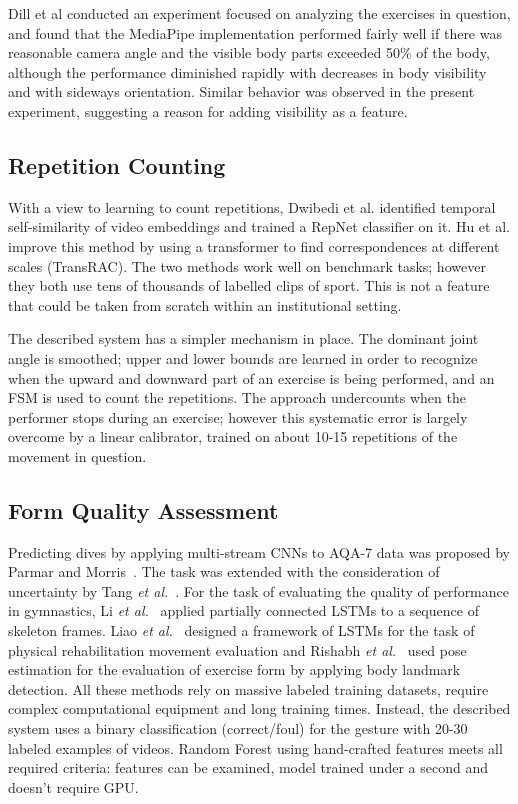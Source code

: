 \documentclass[conference]{IEEEtran}
\begin{document}
Dill et al \cite{dill2023} conducted an experiment focused on analyzing the exercises in question, and found that the MediaPipe implementation performed fairly well if there was reasonable camera angle and the visible body parts exceeded 50\% of the body, although the performance diminished rapidly with decreases in body visibility and with sideways orientation. Similar behavior was observed in the present experiment, suggesting a reason for adding visibility as a feature.

\subsection{Repetition Counting}
With a view to learning to count repetitions, Dwibedi et al. \cite{dwibedi2020} identified temporal self-similarity of video embeddings and trained a RepNet classifier on it. Hu et al. \cite{hu2022} improve this method by using a transformer to find correspondences at different scales (TransRAC). The two methods work well on benchmark tasks; however they both use tens of thousands of labelled clips of sport. This is not a feature that could be taken from scratch within an institutional setting.

The described system has a simpler mechanism in place. The dominant joint angle is smoothed; upper and lower bounds are learned in order to recognize when the upward and downward part of an exercise is being performed, and an FSM is used to count the repetitions. The approach undercounts when the performer stops during an exercise; however this systematic error is largely overcome by a linear calibrator, trained on about 10-15 repetitions of the movement in question.

\subsection{Form Quality Assessment}
Predicting dives by applying multi-stream CNNs to AQA-7 data was proposed by Parmar and Morris~\cite{parmar2019}. The task was extended with the consideration of uncertainty by Tang \textit{et al.}~\cite{tang2020}. For the task of evaluating the quality of performance in gymnastics, Li \textit{et al.}~\cite{li2023} applied partially connected LSTMs to a sequence of skeleton frames. Liao \textit{et al.}~\cite{liao2020} designed a framework of LSTMs for the task of physical rehabilitation movement evaluation and Rishabh \textit{et al.}~\cite{rishabh2024} used pose estimation for the evaluation of exercise form by applying body landmark detection. All these methods rely on massive labeled training datasets, require complex computational equipment and long training times. Instead, the described system uses a binary classification (correct/foul) for the gesture with 20-30 labeled examples of videos. Random Forest using hand-crafted features meets all required criteria: features can be examined, model trained under a second and doesn't require GPU.
\end{document}
